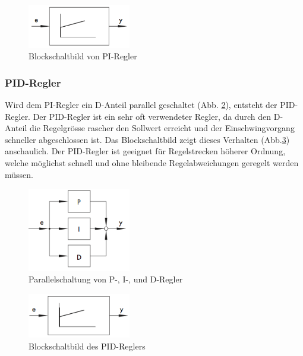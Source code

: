 \begin{figure}[h!, width=\pagewidth]
    \centering
    \includegraphics[width=0.4\textwidth]{images/PIRegler2}
    \caption{Blockschaltbild von PI-Regler}
    \label{fig:PIRegler2}
\end{figure}


\subsubsection{PID-Regler}

Wird    dem    PI-Regler    ein    D-Anteil    parallel    geschaltet    (Abb.
\ref{fig:PRDRegler1}), entsteht  der PID-Regler. Der  PID-Regler ist  ein sehr
oft verwendeter  Regler, da durch  den D-Anteil die Regelgr\"osse  rascher den
Sollwert erreicht  und der Einschwingvorgang schneller  abgeschlossen ist. Das
Blockschaltbild  zeigt dieses  Verhalten (Abb.\ref{fig:PID})  anschaulich. Der
PID-Regler  ist   geeignet  f\"ur  Regelstrecken  h\"oherer   Ordnung,  welche
m\"oglichst  schnell  und  ohne bleibende  Regelabweichungen  geregelt  werden
m\"ussen.

\begin{figure}[h!, width=\pagewidth]
    \centering
    \includegraphics[width=0.4\textwidth]{images/PRDRegler1}
    \caption{Parallelschaltung von P-, I-, und D-Regler}
    \label{fig:PRDRegler1}
\end{figure}

\begin{figure}[h!, width=\pagewidth]
    \centering
    \includegraphics[width=0.4\textwidth]{images/PIDRegler2.png}
    \caption{Blockschaltbild des PID-Reglers}
    \label{fig:PID}
\end{figure}
